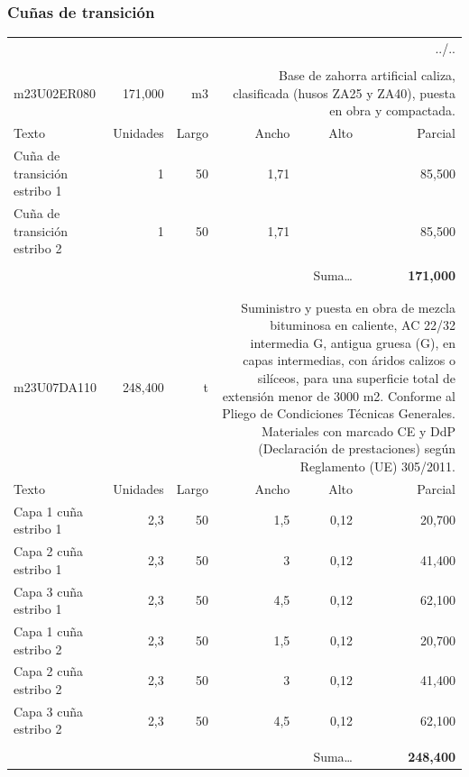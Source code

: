 \documentclass{book}%
\begin{document}
\subsubsection{Cuñas de transición}%
\begin{longtable}{lrrrrr}%
\multicolumn{6}{r}{../..}\\%
\endfoot%
\endlastfoot%
&&&&&\\%
m23U02ER080&   171,000& m3&\multicolumn{3}{p{6cm}}{\scriptsize Base de zahorra artificial caliza, clasificada (husos ZA25 y ZA40), puesta en obra y compactada.\normalsize}\\%
Texto&Unidades&Largo&Ancho&Alto&Parcial\\%
\hline%
\multicolumn{1}{p{3.5cm}}{Cuña de transición estribo 1}&1&50&1,71&&    85,500\\%
\multicolumn{1}{p{3.5cm}}{Cuña de transición estribo 2}&1&50&1,71&&    85,500\\%
&&&&&\\%
\multicolumn{5}{r}{Suma\ldots}&\textbf{   171,000}\\%
\hline%
&&&&&\\%
&&&&&\\%
m23U07DA110&   248,400& t&\multicolumn{3}{p{6cm}}{\scriptsize Suministro y puesta en obra de mezcla bituminosa en caliente, AC 22/32 intermedia G, antigua gruesa (G), en capas intermedias, con áridos calizos o silíceos, para una superficie total de extensión menor de 3000 m2. Conforme al Pliego de Condiciones Técnicas Generales. Materiales con marcado CE y DdP (Declaración de prestaciones) según Reglamento (UE) 305/2011.\normalsize}\\%
Texto&Unidades&Largo&Ancho&Alto&Parcial\\%
\hline%
\multicolumn{1}{p{3.5cm}}{Capa 1 cuña estribo 1}&2,3&50&1,5&0,12&    20,700\\%
\multicolumn{1}{p{3.5cm}}{Capa 2 cuña estribo 1}&2,3&50&3&0,12&    41,400\\%
\multicolumn{1}{p{3.5cm}}{Capa 3 cuña estribo 1}&2,3&50&4,5&0,12&    62,100\\%
\multicolumn{1}{p{3.5cm}}{Capa 1 cuña estribo 2}&2,3&50&1,5&0,12&    20,700\\%
\multicolumn{1}{p{3.5cm}}{Capa 2 cuña estribo 2}&2,3&50&3&0,12&    41,400\\%
\multicolumn{1}{p{3.5cm}}{Capa 3 cuña estribo 2}&2,3&50&4,5&0,12&    62,100\\%
&&&&&\\%
\multicolumn{5}{r}{Suma\ldots}&\textbf{   248,400}\\%

\end{longtable}
\end{document}
